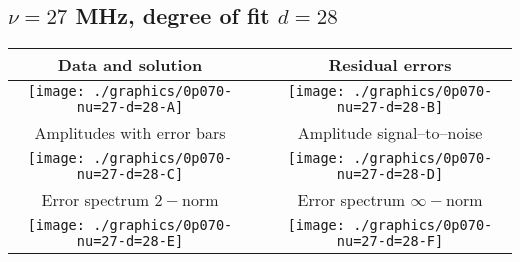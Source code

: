 

% 

\clearpage{}
\break{}

\subsection{$\nu = 27$ MHz, degree of fit $d = 28$}

\begin{table}[h]
    \begin{center}
        \begin{tabular}{ccc}
            Data and solution & \quad & Residual errors \\\hline
            \texttt{[image: ./graphics/0p070-nu=27-d=28-A]} &&
            \texttt{[image: ./graphics/0p070-nu=27-d=28-B]} \\[15pt]
            Amplitudes with error bars && Amplitude signal--to--noise \\\hline
            \texttt{[image: ./graphics/0p070-nu=27-d=28-C]} &&
            \texttt{[image: ./graphics/0p070-nu=27-d=28-D]} \\[15pt]
            Error spectrum $2-$norm && Error spectrum $\infty-$norm \\\hline
            \texttt{[image: ./graphics/0p070-nu=27-d=28-E]} &&
            \texttt{[image: ./graphics/0p070-nu=27-d=28-F]} \\[15pt]
        \end{tabular}
    \end{center}
\label{fig:elev=70, nu=27}
\end{table}



\endinput
